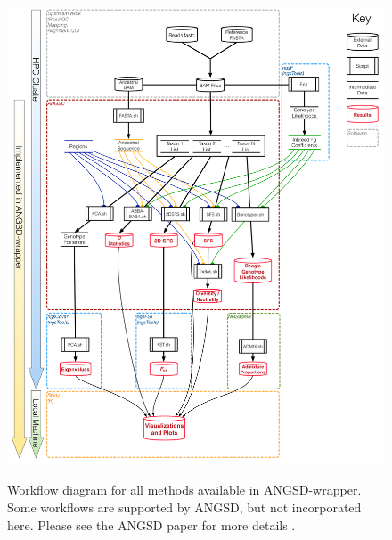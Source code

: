 \renewcommand{\thefigure}{S\arabic{figure}}
\renewcommand{\thetable}{S\arabic{table}}
\setcounter{figure}{0}
\setcounter{table}{0}

\begin{figure}
\centering
\caption{Workflow diagram for all methods available in ANGSD-wrapper. Some workflows are supported by ANGSD, but not incorporated here. Please see the ANGSD paper for more details \citep{korneliussen2014angsd}.}
\includegraphics[width=\linewidth]{figures/Wiki_Workflow_Rev1.pdf}
\label{fig:supp2}
\end{figure}


